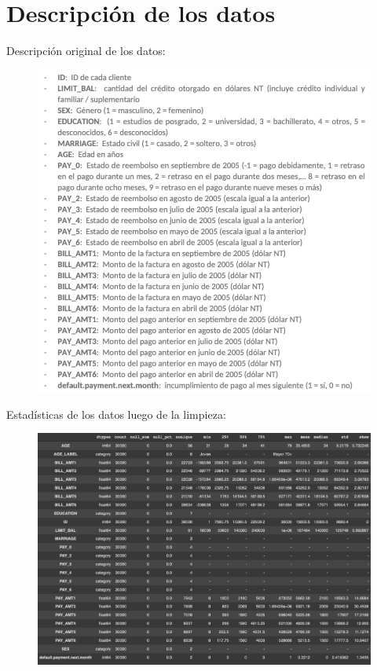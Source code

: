 \section{Descripción de los datos}
Descripción original de los datos: 
\begin{figure}[H]
	\centering
	\includegraphics[scale=0.5]{Images/1}
\end{figure}
Estadísticas de los datos luego de la limpieza: 
\begin{figure}[H]
	\centering
	\includegraphics[scale=0.4]{Images/2}
\end{figure}

